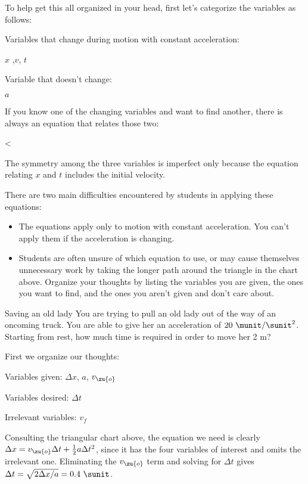 \pagebreak[4]

To help get this all organized in your head, first let's
categorize the variables as follows:

\noindent Variables that change during motion with constant acceleration:

    $x$ ,$v$, $t$

\noindent Variable that doesn't change:

   $a$

\noindent If you know one of the changing variables and want to find
another, there is always an equation that relates those two:

<%

The symmetry among the three variables is imperfect only
because the equation relating $x$ and $t$ includes
the initial velocity.

There are two main difficulties encountered by students in
applying these equations:

\begin{itemize}

\item  The equations apply only to motion with constant
acceleration. You can't apply them if the acceleration is changing.

\item  Students are often unsure of which equation to use, or may
cause themselves unnecessary work by taking the longer path
around the triangle in the chart above. Organize your
thoughts by listing the variables you are given, the ones
you want to find, and the ones you aren't given and don't care about.

\end{itemize}

\begin{eg}{Saving an old lady}
\egquestion You are trying to pull an old lady out of the way
of an oncoming truck. You are able to give her an acceleration
of $20\ \munit/\sunit^2$. Starting from rest, how much time is required
in order to move her 2 m?

\eganswer First we organize our thoughts:

    Variables given:    $\Delta x$, $a$, $v_\zu{o}$

    Variables desired:    $\Delta t$

    Irrelevant variables: $v_f$

\noindent Consulting the triangular chart above, the equation we need
is clearly  $\Delta x=v_\zu{o}\Delta t+\frac{1}{2}a\Delta t^2$, since it has the four variables of interest
and omits the irrelevant one. Eliminating the $v_\zu{o}$ term and
solving for $\Delta t$ gives $\Delta t=\sqrt{2\Delta x/a}=0.4\ \sunit$.

\end{eg}

